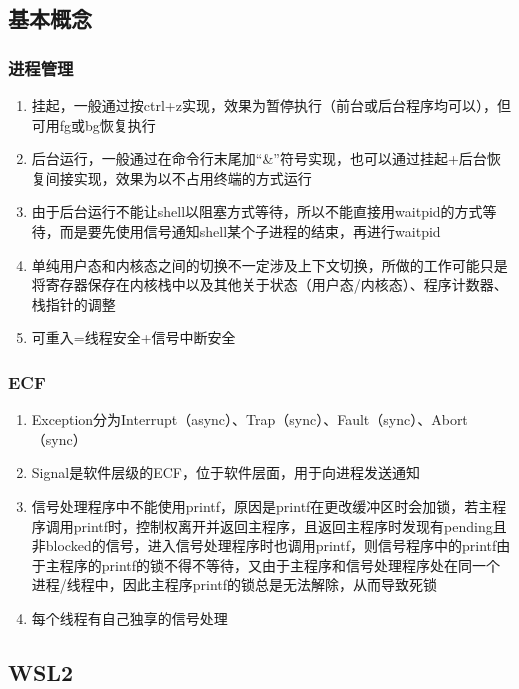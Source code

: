 \documentclass[onecolumn]{article}
\begin{document}
    \subsection{基本概念}
        \subsubsection{进程管理}
            \noindent
            \begin{enumerate}
                \item 挂起，一般通过按ctrl+z实现，效果为暂停执行（前台或后台程序均可以），但可用fg或bg恢复执行
                \item 后台运行，一般通过在命令行末尾加“\&”符号实现，也可以通过挂起+后台恢复间接实现，效果为以不占用终端的方式运行
                \item 由于后台运行不能让shell以阻塞方式等待，所以不能直接用waitpid的方式等待，而是要先使用信号通知shell某个子进程的结束，再进行waitpid
                \item 单纯用户态和内核态之间的切换不一定涉及上下文切换，所做的工作可能只是将寄存器保存在内核栈中以及其他关于状态（用户态/内核态）、程序计数器、栈指针的调整
                \item 可重入=线程安全+信号中断安全
            \end{enumerate}
        \subsubsection{ECF}
            \noindent
            \begin{enumerate}
                \item Exception分为Interrupt（async）、Trap（sync）、Fault（sync）、Abort（sync）
                \item Signal是软件层级的ECF，位于软件层面，用于向进程发送通知
                \item 信号处理程序中不能使用printf，原因是printf在更改缓冲区时会加锁，若主程序调用printf时，控制权离开并返回主程序，且返回主程序时发现有pending且非blocked的信号，进入信号处理程序时也调用printf，则信号程序中的printf由于主程序的printf的锁不得不等待，又由于主程序和信号处理程序处在同一个进程/线程中，因此主程序printf的锁总是无法解除，从而导致死锁
                \item 每个线程有自己独享的信号处理
            \end{enumerate}
    \subsection{WSL2}
\end{document}
